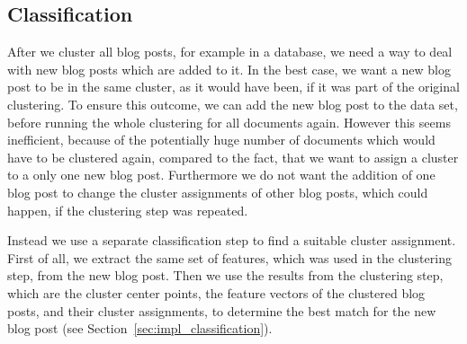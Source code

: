 
\subsection{Classification}
\label{sec:classification}


After we cluster all blog posts, for example in a database, we need a way to deal with new blog posts which are added to it.
In the best case, we want a new blog post to be in the same cluster, as it would have been, if it was part of the original clustering.
To ensure this outcome, we can add the new blog post to the data set, before running the whole clustering for all documents again.
However this seems inefficient, because of the potentially huge number of documents which would have to be clustered again, compared to the fact, that we want to assign a cluster to a only one new blog post.
Furthermore we do not want the addition of one blog post to change the cluster assignments of other blog posts, which could happen, if the clustering step was repeated.


Instead we use a separate classification step to find a suitable cluster assignment.
First of all, we extract the same set of features, which was used in the clustering step, from the new blog post.
Then we use the results from the clustering step, which are the cluster center points, the feature vectors of the clustered blog posts, and their cluster assignments, to determine the best match for the new blog post (see Section~\ref{sec:impl_classification}).